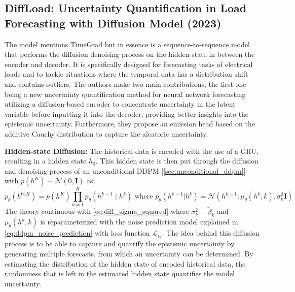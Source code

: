 \subsection{DiffLoad: Uncertainty Quantification in Load Forecasting with Diffusion Model (2023) \cite{wang_diffload_2023}} \label{sec:diffload}
The model mentions TimeGrad \cite{rasul_autoregressive_2021} but in essence is a sequence-to-sequence model \cite{sutskever_sequence_2014} that performs the diffusion denoising process on the hidden state in between the encoder and decoder. It is specifically designed for forecasting tasks of electrical loads and to tackle situations where the temporal data has a distribution shift and contains outliers. The authors make two main contributions, the first one being a new uncertainty quantification method for neural network forecasting utilizing a diffusion-based encoder to concentrate uncertainty in the latent variable before inputting it into the decoder, providing better insights into the epistemic uncertainty. Furthermore, they propose an emission head based on the additive Cauchy distribution to capture the aleatoric uncertainty.

\textbf{Hidden-state Diffusion:}
The historical data is encoded with the use of a GRU, resulting in a hidden state $h_0$. This hidden state is then put through the diffusion and denoising process of an unconditional DDPM [\ref{sec:unconditional_ddpm}] with $p(h^K) \sim \mathcal{N}(0, \mathbf{I})$ as: 
\begin{equation}
 \label{eq:diffload_reverse_process}
     p_\theta(h^{0:K}) = p(h^K)\prod_{k=1}^{K} p_\theta(h^{k-1} \mid h^k) \text{ where } p_\theta(h^{k-1} | h^k) = \mathcal{N} (h^{k-1}; \mu_\theta(h^k, k), \sigma^2_k \mathbf{I})
\end{equation}
The theory continuous with \autoref{eq:diff_sigma_squared} where $\sigma_k^2 = \tilde{\beta}_k$ and $\mu_\theta(h^k, k)$ is reparameterized with the noise prediction model explained in \autoref{eq:ddpm_noise_prediction} with loss function $\mathcal{L}_{\epsilon_\theta}$. The idea behind this diffusion process is to be able to capture and quantify the epistemic uncertainty by generating multiple forecasts, from which an uncertainty can be determined. By estimating the distribution of the hidden state of encoded historical data, the randomness that is left in the estimated hidden state quantifies the model uncertainty. 

